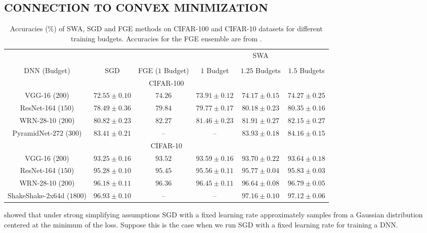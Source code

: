 \documentclass[letterpaper]{article}
\begin{document}
\subsection{CONNECTION TO CONVEX MINIMIZATION}
\label{sec:geometry}
\begin{table*}[!th]
	\caption{Accuracies ($\%$) of SWA, SGD and FGE methods on CIFAR-100 and CIFAR-10 datasets for different training budgets. Accuracies for the FGE ensemble are from \citet{garipov2018}.}
	\label{table:main_experiments}
	\centering
	\begin{tabular}{cccccc}
		\toprule
	 & & & \multicolumn{3}{c}{SWA}	\\
	 \cline{4-6}
	 \\[-1em]	
    DNN (Budget) & SGD & FGE ($1$ Budget) & $1$ Budget & $1.25$ Budgets & $1.5$ Budgets \\
		\hline
		\multicolumn{6}{c}{\small CIFAR-100}\\
		\hline
    VGG-16 ($200$) &
    $72.55 \pm 0.10$ & $74.26$ & $73.91 \pm 0.12$ & $74.17 \pm 0.15$ & $74.27 \pm 0.25$ \\
    ResNet-164 ($150$) &
    $78.49 \pm 0.36$ & $79.84$ & $79.77 \pm 0.17$ & $80.18 \pm 0.23$ & $80.35 \pm 0.16$ \\
    WRN-28-10 ($200$) &
    $80.82 \pm 0.23$ & $82.27$ & $81.46 \pm 0.23$ & $81.91 \pm 0.27$ & $82.15 \pm 0.27$ \\
    PyramidNet-$272$ ($300$) &
    $ 83.41 \pm 0.21 $ & --& -- & $83.93 \pm 0.18 $ & $84.16 \pm 0.15$\\
		\hline 
    \multicolumn{6}{c}{\small CIFAR-10}\\
		\hline 
    VGG-16 ($200$) &
    $93.25 \pm 0.16$ & $93.52$ & $93.59 \pm 0.16$ & $93.70 \pm 0.22$ & $93.64 \pm 0.18$ \\
    ResNet-164 ($150$) &
    $95.28 \pm 0.10$ & $95.45$ & $95.56 \pm 0.11$ & $95.77 \pm 0.04$ & $95.83 \pm 0.03$ \\
    WRN-28-10 ($200$) &
    $96.18 \pm 0.11$ &$96.36$& $96.45 \pm 0.11$ & $96.64 \pm 0.08$ & $96.79 \pm 0.05$ \\
    ShakeShake-2x64d ($1800$) &
    $96.93 \pm 0.10$ & -- & -- & $97.16 \pm 0.10$ & $97.12 \pm 0.06$ \\
		\bottomrule   
	\end{tabular}
\end{table*}


\citet{mandt2017stochastic} showed that under strong simplifying assumptions SGD with 
a fixed learning rate approximately samples from a Gaussian distribution 
centered at the minimum of the loss. Suppose this is the case when we run
SGD with a fixed learning rate for training a DNN. 
\end{document}
